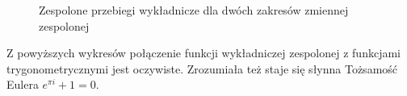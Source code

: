\documentclass[12pt,titlepage]{report}
\begin{document}
\begin{figure}[!h]
	\centering
	\par
	\caption{Zespolone przebiegi wykładnicze dla dwóch zakresów zmiennej zespolonej}
\end{figure}
Z powyższych wykresów połączenie funkcji wykładniczej zespolonej z funkcjami trygonometrycznymi jest oczywiste. Zrozumiała też staje się słynna Tożsamość Eulera ${e}^{\pi i} + 1 = 0$.
\newpage
\end{document}
